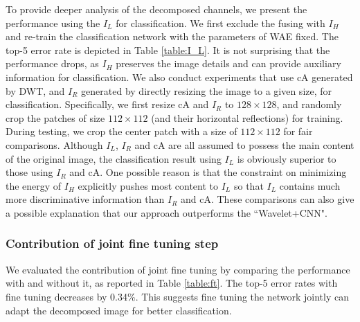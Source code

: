 \documentclass[letterpaper]{article} %
\begin{document}
To provide deeper analysis of the decomposed channels, we present the performance using the $I_L$ for classification. We first exclude the fusing with $I_H$ and re-train the classification network with the parameters of WAE fixed. The top-5 error rate is depicted in Table \ref{table:I_L}. It is not surprising that the performance drops, as $I_H$ preserves the image details and can provide auxiliary information for classification. We also conduct experiments that use cA generated by DWT, and $I_R$ generated by directly resizing the image to a given size, for classification. Specifically, we first resize cA and $I_R$ to $128 \times 128$, and randomly crop the patches of size $112 \times 112$ (and their horizontal reflections) for training. During testing, we crop the center patch with a size of $112 \times 112$ for fair comparisons. Although $I_L$, $I_R$ and cA are all assumed to possess the main content of the original image, the classification result using $I_L$ is obviously superior to those using $I_R$ and cA. One possible reason is that the constraint on minimizing the energy of $I_H$ explicitly pushes most content to $I_L$ so that $I_L$ contains much more discriminative information than $I_R$ and cA. These comparisons can also give a possible explanation that our approach outperforms the ``Wavelet+CNN". 



\subsubsection{Contribution of joint fine tuning step}
We evaluated the contribution of joint fine tuning by comparing the performance with and without it, as reported in Table \ref{table:ft}. The top-5 error rates with fine tuning decreases by 0.34\%. This suggests fine tuning the network jointly can adapt the decomposed image for better classification.
\end{document}
